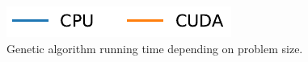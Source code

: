 \begin{figure}[ht!]
    \begin{minipage}[t]{0.15\textwidth}
        \includegraphics[width=\textwidth]{img/runs/time_ga_clausecount_legend.pdf}
    \end{minipage}

    \caption[Running times of GA depending on problem size]{Genetic algorithm running time depending on problem size. }
\end{figure}





